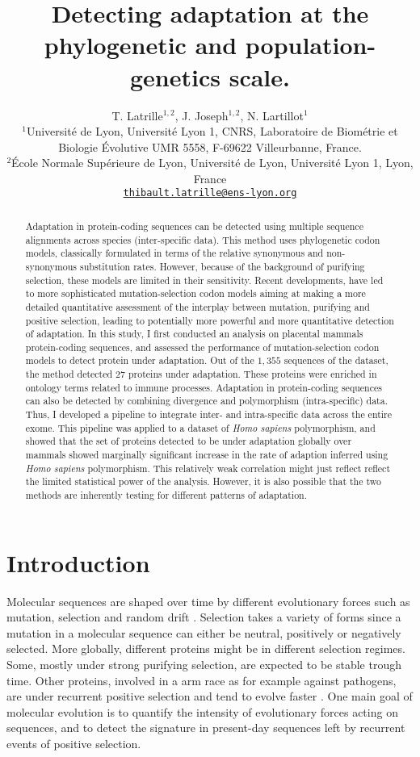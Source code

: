 \documentclass{article}
\title{Detecting adaptation at the phylogenetic and population-genetics scale.}
\author{
	\large
	T. {Latrille}$^{1,2}$, J. Joseph$^{1,2}$, N. {Lartillot}$^{1}$ \\
	\normalsize
	$^{1}$Université de Lyon, Université Lyon 1, CNRS, Laboratoire de Biométrie et Biologie Évolutive UMR 5558, F-69622 Villeurbanne, France.\\
	$^{2}$École Normale Supérieure de Lyon, Université de Lyon, Université Lyon 1, Lyon, France\\
	\texttt{\href{mailto:thibault.latrille@ens-lyon.org}{thibault.latrille@ens-lyon.org}} \\
}
\begin{document}
	\maketitle
	
	\begin{abstract}
		Adaptation in protein-coding sequences can be detected using multiple sequence alignments across species (inter-specific data). This method uses phylogenetic codon models, classically formulated in terms of the relative synonymous and non-synonymous substitution rates. However, because of the background of purifying selection, these models are limited in their sensitivity. Recent developments, have led to more sophisticated mutation-selection codon models aiming at making a more detailed quantitative assessment of the interplay between mutation, purifying and positive selection, leading to potentially more powerful and more quantitative detection of adaptation.
		In this study, I first conducted an analysis on placental mammals protein-coding sequences, and assessed the performance of mutation-selection codon models to detect protein under adaptation. Out of the $1,355$ sequences of the dataset, the method detected $27$ proteins under adaptation. These proteins were enriched in ontology terms related to immune processes.
		Adaptation in protein-coding sequences can also be detected by combining divergence and polymorphism (intra-specific) data. Thus, I developed a pipeline to integrate inter- and intra-specific data across the entire exome. This pipeline was applied to a dataset of \textit{Homo sapiens} polymorphism, and showed that the set of proteins detected to be under adaptation globally over mammals showed marginally significant increase in the rate of adaption inferred using \textit{Homo sapiens} polymorphism. This relatively weak correlation might just reflect reflect the limited statistical power of the analysis. However, it is also possible that the two methods are inherently testing for different patterns of adaptation.
	\end{abstract}
	
	
	\section*{Introduction}

	Molecular sequences are shaped over time by different evolutionary forces such as mutation, selection and random drift \cite{ohta_nearly_1992}. Selection takes a variety of forms since a mutation in a molecular sequence can either be neutral, positively or negatively selected. More globally, different proteins might be in different selection regimes. Some, mostly under strong purifying selection, are expected to be stable trough time.
	Other proteins, involved in a arm race as for example against pathogens, are under recurrent positive selection and tend to evolve faster \cite{enard_viruses_2016}. One main goal of molecular evolution is to quantify the intensity of evolutionary forces acting on sequences, and to detect the signature in present-day sequences left by recurrent events of positive selection. \\
	
\end{document}
